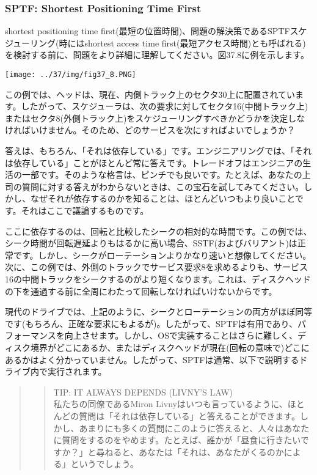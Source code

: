 \hypertarget{sptf-shortest-positioning-time-first}{%
\subsubsection*{SPTF: Shortest Positioning Time
First}\label{sptf-shortest-positioning-time-first}}

shortest positioning time
first(最短の位置時間)、問題の解決策であるSPTFスケジューリング(時にはshortest
access time
first(最短アクセス時間)とも呼ばれる)を検討する前に、問題をより詳細に理解してください。図37.8に例を示します。

\texttt{[image: ../37/img/fig37\_8.PNG]}

この例では、ヘッドは、現在、内側トラック上のセクタ30上に配置されています。したがって、スケジューラは、次の要求に対してセクタ16(中間トラック上)またはセクタ8(外側トラック上)をスケジューリングすべきかどうかを決定しなければいけません。そのため、どのサービスを次にすればよいでしょうか？

答えは、もちろん、「それは依存している」です。エンジニアリングでは、「それは依存している」ことがほとんど常に答えです。トレードオフはエンジニアの生活の一部です。そのような格言は、ピンチでも良いです。たとえば、あなたの上司の質問に対する答えがわからないときは、この宝石を試してみてください。しかし、なぜそれが依存するのかを知ることは、ほとんどいつもより良いことです。それはここで議論するものです。

ここに依存するのは、回転と比較したシークの相対的な時間です。この例では、シーク時間が回転遅延よりもはるかに高い場合、SSTF(およびバリアント)は正常です。しかし、シークがローテーションよりかなり速いと想像してください。次に、この例では、外側のトラックでサービス要求8を求めるよりも、サービス16の中間トラックをシークするのがより短くなります。これは、ディスクヘッドの下を通過する前に全周にわたって回転しなければいけないからです。

現代のドライブでは、上記のように、シークとローテーションの両方がほぼ同等です(もちろん、正確な要求にもよるが)。したがって、SPTFは有用であり、パフォーマンスを向上させます。しかし、OSで実装することはさらに難しく、ディスク境界がどこにあるか、またはディスクヘッドが現在(回転の意味で)どこにあるかはよく分かっていません。したがって、SPTFは通常、以下で説明するドライブ内で実行されます。

\begin{quote}
\begin{quote}
TIP: IT ALWAYS DEPENDS (LIVNY'S LAW)\\
私たちの同僚であるMiron
Livnyはいつも言っているように、ほとんどの質問は「それは依存している」と答えることができます。しかし、あまりにも多くの質問にこのように答えると、人々はあなたに質問をするのをやめます。たとえば、誰かが「昼食に行きたいですか？」と尋ねると、あなたは「それは、あなたがくるのかによる」というでしょう。
\end{quote}
\end{quote}

